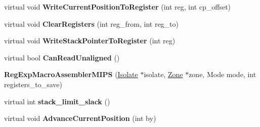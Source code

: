 \begin{DoxyCompactItemize}
\item 
virtual void {\bfseries Write\+Current\+Position\+To\+Register} (int reg, int cp\+\_\+offset)\hypertarget{classv8_1_1internal_1_1_reg_exp_macro_assembler_m_i_p_s_af342e57819b985ea254b8bcd994505e0}{}\label{classv8_1_1internal_1_1_reg_exp_macro_assembler_m_i_p_s_af342e57819b985ea254b8bcd994505e0}

\item 
virtual void {\bfseries Clear\+Registers} (int reg\+\_\+from, int reg\+\_\+to)\hypertarget{classv8_1_1internal_1_1_reg_exp_macro_assembler_m_i_p_s_ab12457b77455544117c217d04628a2d4}{}\label{classv8_1_1internal_1_1_reg_exp_macro_assembler_m_i_p_s_ab12457b77455544117c217d04628a2d4}

\item 
virtual void {\bfseries Write\+Stack\+Pointer\+To\+Register} (int reg)\hypertarget{classv8_1_1internal_1_1_reg_exp_macro_assembler_m_i_p_s_a842cf0974df70e03bbfeef991faa5840}{}\label{classv8_1_1internal_1_1_reg_exp_macro_assembler_m_i_p_s_a842cf0974df70e03bbfeef991faa5840}

\item 
virtual bool {\bfseries Can\+Read\+Unaligned} ()\hypertarget{classv8_1_1internal_1_1_reg_exp_macro_assembler_m_i_p_s_adc3f178837a4dedd136bb43cbdebc165}{}\label{classv8_1_1internal_1_1_reg_exp_macro_assembler_m_i_p_s_adc3f178837a4dedd136bb43cbdebc165}

\item 
{\bfseries Reg\+Exp\+Macro\+Assembler\+M\+I\+PS} (\hyperlink{classv8_1_1internal_1_1_isolate}{Isolate} $\ast$isolate, \hyperlink{classv8_1_1internal_1_1_zone}{Zone} $\ast$zone, Mode mode, int registers\+\_\+to\+\_\+save)\hypertarget{classv8_1_1internal_1_1_reg_exp_macro_assembler_m_i_p_s_aa6806a1e3af86ec20cc1077c01607b24}{}\label{classv8_1_1internal_1_1_reg_exp_macro_assembler_m_i_p_s_aa6806a1e3af86ec20cc1077c01607b24}

\item 
virtual int {\bfseries stack\+\_\+limit\+\_\+slack} ()\hypertarget{classv8_1_1internal_1_1_reg_exp_macro_assembler_m_i_p_s_ade29d0ccd6722e1078ec888188917f9d}{}\label{classv8_1_1internal_1_1_reg_exp_macro_assembler_m_i_p_s_ade29d0ccd6722e1078ec888188917f9d}

\item 
virtual void {\bfseries Advance\+Current\+Position} (int by)\hypertarget{classv8_1_1internal_1_1_reg_exp_macro_assembler_m_i_p_s_a8b46dd14d6be7b20399d60416582b610}{}\label{classv8_1_1internal_1_1_reg_exp_macro_assembler_m_i_p_s_a8b46dd14d6be7b20399d60416582b610}


\end{DoxyCompactItemize}
